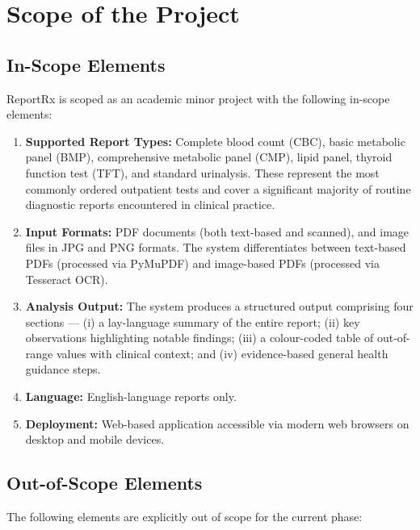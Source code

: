 \documentclass[12pt,a4paper]{report}
\begin{document}
\section{Scope of the Project}

\subsection{In-Scope Elements}
ReportRx is scoped as an academic minor project with the following in-scope elements:

\begin{enumerate}
    \item \textbf{Supported Report Types:} Complete blood count (CBC), basic metabolic panel (BMP), comprehensive metabolic panel (CMP), lipid panel, thyroid function test (TFT), and standard urinalysis. These represent the most commonly ordered outpatient tests and cover a significant majority of routine diagnostic reports encountered in clinical practice.
    \item \textbf{Input Formats:} PDF documents (both text-based and scanned), and image files in JPG and PNG formats. The system differentiates between text-based PDFs (processed via PyMuPDF) and image-based PDFs (processed via Tesseract OCR).
    \item \textbf{Analysis Output:} The system produces a structured output comprising four sections --- (i) a lay-language summary of the entire report; (ii) key observations highlighting notable findings; (iii) a colour-coded table of out-of-range values with clinical context; and (iv) evidence-based general health guidance steps.
    \item \textbf{Language:} English-language reports only.
    \item \textbf{Deployment:} Web-based application accessible via modern web browsers on desktop and mobile devices.
\end{enumerate}

\subsection{Out-of-Scope Elements}
The following elements are explicitly out of scope for the current phase:
\end{document}
